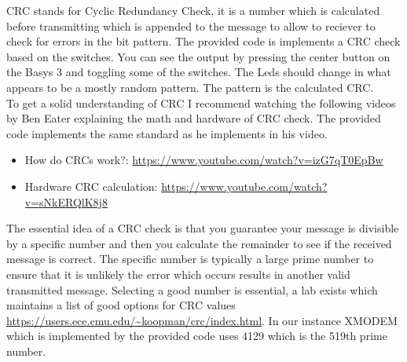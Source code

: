 
CRC stands for Cyclic Redundancy Check, it is a number which is calculated before transmitting which is appended to the message to allow to reciever to check for errors in the bit pattern. The provided code is implements a CRC check based on the switches. You can see the output by pressing the center button on the Basys 3 and toggling some of the switches. The Leds should change in what appears to be a mostly random pattern. The pattern is the calculated CRC. \\

\vspace{1cm}
To get a solid understanding of CRC I recommend watching the following videos by Ben Eater explaining the math and hardware of CRC check. The provided code implements the same standard as he implements in his video.
\begin{itemize}
    \item How do CRCs work?: \url{https://www.youtube.com/watch?v=izG7qT0EpBw}
    \item Hardware CRC calculation: \url{https://www.youtube.com/watch?v=sNkERQlK8j8}
\end{itemize}

The essential idea of a CRC check is that you guarantee your message is divisible by a specific number and then you calculate the remainder to see if the received message is correct. The specific number is typically a large prime number to ensure that it is unlikely the error which occurs results in another valid transmitted message. Selecting a good number is essential, a lab exists which maintains a list of good options for CRC values \url{https://users.ece.cmu.edu/~koopman/crc/index.html}. In our instance XMODEM which is implemented by the provided code uses 4129 which is the 519th prime number. 

